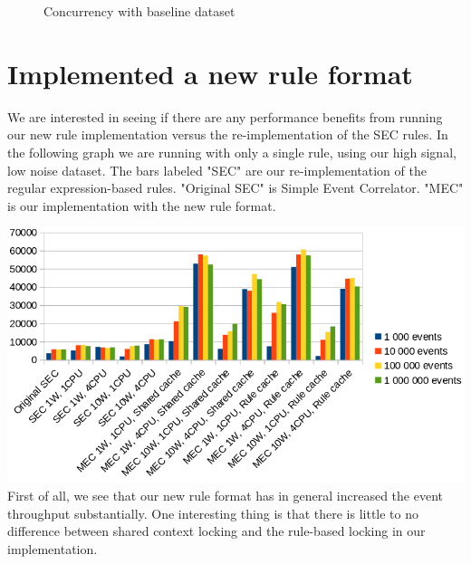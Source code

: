 \begin{figure}[ht]
\centering
\pgfplotsset{scaled y ticks=false}
\caption{Concurrency with baseline dataset}
\label{fig:multicore-b-perf}
\end{figure}

\section{Implemented a new rule format}

We are interested in seeing if there are any performance benefits from running our new rule implementation versus the re-implementation of the SEC rules. In the following graph we are running with only a single rule, using our high signal, low noise dataset. The bars labeled "SEC" are our re-implementation of the regular expression-based rules. "Original SEC" is Simple Event Correlator. "MEC" is our implementation with the new rule format.

\includegraphics[scale=0.525]{figures/new-rule-format/performance.png}
\\
First of all, we see that our new rule format has in general increased the event throughput substantially. One interesting thing is that there is little to no difference between shared context locking and the rule-based locking in our implementation.

